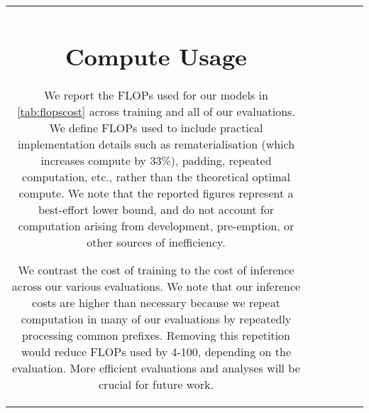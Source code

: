 \documentclass[11pt, a4paper, logo, internal, copyright, nonumbering]{deepmind}
\begin{document}
\begin{center}
\begin{longtable}{cclccc}
{\section{Compute Usage}
\label{app:compute}
We report the FLOPs used for our models in \autoref{tab:flopscost} across training and all of our evaluations. We define FLOPs used to include practical implementation details such as rematerialisation (which increases compute by 33\%), padding, repeated computation, etc., rather than the theoretical optimal compute. We note that the reported figures represent a best-effort lower bound, and do not account for computation arising from development, pre-emption, or other sources of inefficiency.

We contrast the cost of training to the cost of inference across our various evaluations. We note that our inference costs are higher than necessary because we repeat computation in many of our evaluations by repeatedly processing common prefixes. Removing this repetition would reduce FLOPs used by 4-100, depending on the evaluation. More efficient evaluations and analyses will be crucial for future work.

}
\end{longtable}
\end{center}
\end{document}
